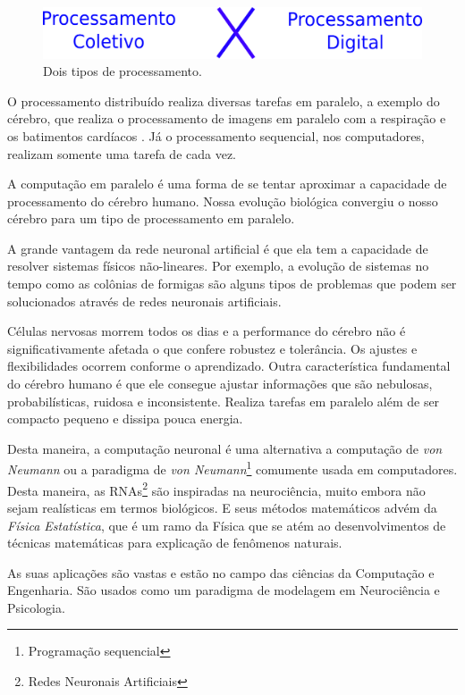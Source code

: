 \begin{figure}[H]
	\centering
	\includegraphics[width=1\textwidth]{Imagens/Fig2.png}
	\caption{Dois tipos de processamento.}
\end{figure}

O processamento distribuído realiza diversas tarefas em paralelo, a exemplo do cérebro, que realiza o processamento de imagens em paralelo com a respiração e os batimentos cardíacos . Já o processamento sequencial, nos computadores, realizam somente uma tarefa de cada vez. 

A computação em paralelo é uma forma de se tentar aproximar a capacidade de processamento do cérebro humano. Nossa evolução biológica convergiu o nosso cérebro para um tipo de processamento em paralelo.  

A grande vantagem da rede neuronal artificial é que ela tem a capacidade de resolver sistemas físicos não-lineares. Por exemplo, a evolução de sistemas no tempo como as colônias de formigas são alguns tipos de problemas que podem ser solucionados através de redes neuronais artificiais. 

Células nervosas morrem todos os dias e a performance do cérebro não é significativamente afetada o que confere robustez e tolerância. Os ajustes e flexibilidades ocorrem conforme o aprendizado. Outra característica fundamental do cérebro humano é que ele consegue ajustar informações que são nebulosas, probabilísticas, ruidosa e inconsistente. Realiza tarefas em paralelo além de ser compacto pequeno e dissipa pouca energia. 

Desta maneira, a computação neuronal é uma alternativa a computação de \textit{von Neumann} ou a paradigma de \textit{von Neumann}\footnote{Programação sequencial} comumente usada em computadores.   Desta maneira, as RNAs\footnote{Redes Neuronais Artificiais} são inspiradas na neurociência, muito embora não sejam realísticas em termos biológicos. E seus métodos matemáticos advém da \textit{Física Estatística}, que é um ramo da Física que se atém ao desenvolvimentos de técnicas matemáticas para explicação de fenômenos naturais. 

As suas aplicações são vastas e estão no campo das ciências da Computação e Engenharia. São usados como um paradigma de modelagem em Neurociência e Psicologia.  

